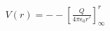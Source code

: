 \documentclass[preview]{standalone}
\begin{document}
\begin{align*}
V(r) = - - \left[ \frac{Q}{4\pi \epsilon_0 r'} \right]_{\infty}^{r}
\end{align*}
\end{document}
